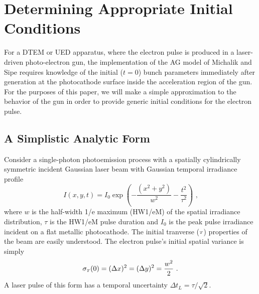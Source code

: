 
\section{Determining Appropriate Initial Conditions} \label{sec:initial_conditions}
For a DTEM or UED apparatus, where the electron pulse is produced in a laser-driven photo-electron gun, the implementation of the AG model of Michalik and Sipe \cite{michalik_analytic_2006} requires knowledge of the initial ($ t = 0 $) bunch parameters immediately after generation at the photocathode surface inside the acceleration region of the gun.
For the purposes of this paper, we will make a simple approximation to the behavior of the gun in order to provide generic initial conditions for the electron pulse.

\subsection{A Simplistic Analytic Form} 

Consider a single-photon photoemission process with a spatially cylindrically symmetric incident Gaussian laser beam with Gaussian temporal irradiance profile 
\begin{equation}\label{eq:laser_form}
I ( x , y , t ) = I_{0} \exp \left ( - \frac{ ( x^{2} +y^{2} ) }{ w^{2} } - \frac{ t^{ 2 } }{ \tau^{ 2 } } \right ) \text{ ,}
\end{equation}
where $w$ is the half-width 1/e maximum (HW1/eM) of the spatial irradiance distribution, $\tau$ is the HW1/eM pulse duration and $I_{0}$ is the peak pulse irradiance incident on a flat metallic photocathode.
The initial tranverse (${\scriptscriptstyle T}$) properties of the beam are easily understood.
The electron pulse's initial spatial variance is simply
\begin{equation}
\sigma_{{\scriptscriptstyle T} } ( 0 ) = ( \Delta x )^{2} = ( \Delta y)^{2} = \frac{ w^{2} }{ 2 } \text{ .}
\end{equation}
A laser pulse of this form has a temporal uncertainty $ \Delta t_{L} = \tau / \sqrt{2} $.

